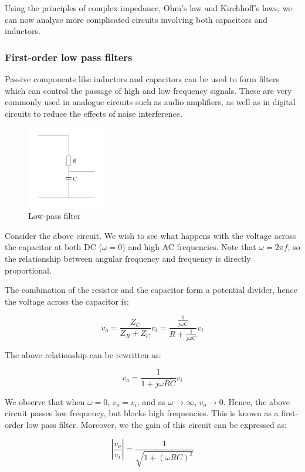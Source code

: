 \documentclass{article}
\begin{document}
Using the principles of complex impedance, Ohm's law and Kirchhoff's laws, we can now analyse more complicated circuits involving both capacitors and inductors.

\subsubsection{First-order low pass filters}

Passive components like inductors and capacitors can be used to form filters which can control the passage of high and low frequency signals. These are very commonly used in analogue circuits such as audio amplifiers, as well as in digital circuits to reduce the effects of noise interference.

\begin{figure}[h]
    \centering
    \includegraphics[width=0.3\textwidth]{images/filter1.png}
    \caption{Low-pass filter}
    \label{fig:filter-low}
\end{figure}

Consider the above circuit. We wish to see what happens with the voltage across the capacitor at both DC ($\omega = 0$) and high AC frequencies. Note that $\omega = 2\pi f$, so the relationship between angular frequency and frequency is directly proportional.

The combination of the resistor and the capacitor form a potential divider, hence the voltage across the capacitor is:

\[ v_o = \frac{Z_C}{Z_R + Z_C}v_i = \frac{\frac{1}{j\omega C}}{R + \frac{1}{j\omega C}}v_i \]

The above relationship can be rewritten as:

\[ v_o = \frac{1}{1 + j\omega RC}v_i \]

We observe that when $\omega = 0$, $v_o = v_i$, and as $\omega \to \infty$, $v_o \to 0$. Hence, the above circuit passes low frequency, but blocks high frequencies. This is known as a first-order low pass filter. Moreover, we the gain of this circuit can be expressed as:

\[ \left|\frac{v_o}{v_i}\right| = \frac{1}{\sqrt{1 + (\omega RC)^2}} \]
\end{document}
